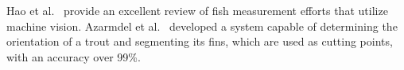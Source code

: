 \documentclass[conference]{IEEEtran}
\begin{document}
Hao et al.~\cite{Hao2015TheMO} provide an excellent review of fish
measurement efforts that utilize machine vision.
Azarmdel et al.~\cite{Azarmdel2019DevelopingAO} developed a system
capable of determining the orientation of a trout and segmenting its fins,
which are used as cutting points, with an accuracy over 99\%.
\end{document}
